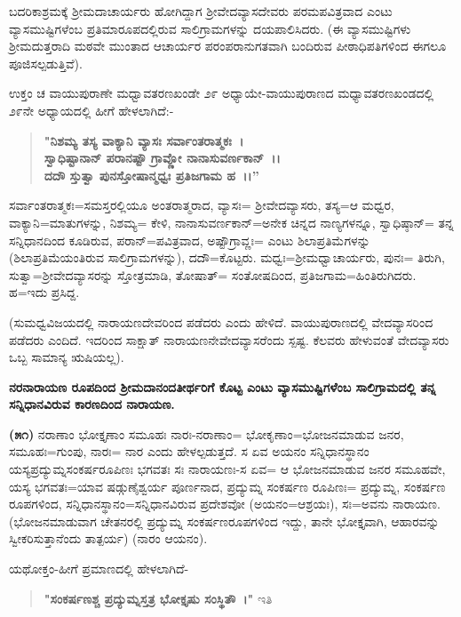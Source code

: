 ಬದರಿಕಾಶ್ರಮಕ್ಕೆ ಶ‍್ರೀಮದಾಚಾರ್ಯರು ಹೋಗಿದ್ದಾಗ ಶ‍್ರೀವೇದವ್ಯಾಸದೇವರು ಪರಮಪವಿತ್ರವಾದ ಎಂಟು ವ್ಯಾಸಮುಷ್ಟಿಗಳೆಂಬ ಪ್ರತಿಮಾರೂಪದಲ್ಲಿರುವ ಸಾಲಿಗ್ರಾಮಗಳನ್ನು ದಯಪಾಲಿಸಿದರು. (ಈ ವ್ಯಾಸಮುಷ್ಟಿಗಳು ಶ‍್ರೀಮದುತ್ತರಾದಿ ಮಠವೇ ಮುಂತಾದ ಆಚಾರ್ಯರ ಪರಂಪರಾನುಗತವಾಗಿ ಬಂದಿರುವ ಪೀಠಾಧಿಪತಿಗಳಿಂದ ಈಗಲೂ ಪೂಜಿಸಲ್ಪಡುತ್ತಿವೆ).

ಉಕ್ತಂ ಚ ವಾಯುಪುರಾಣೇ ಮಧ್ವಾವತರಣಖಂಡೇ ೨೯ ಅಧ್ಯಾಯೇ-ವಾಯು\-ಪುರಾಣದ ಮಧ್ಯಾವತರಣಖಂಡದಲ್ಲಿ ೨೯ನೇ ಅಧ್ಯಾಯದಲ್ಲಿ ಹೀಗೆ ಹೇಳಲಾಗಿದೆ:-

\begin{verse}
\textbf{"ನಿಶಮ್ಯ ತಸ್ಯ ವಾಕ್ಯಾನಿ ವ್ಯಾಸಃ ಸರ್ವಾಂತರಾತ್ಮಕಃ~।}\\\textbf{ಸ್ವಾಧಿಷ್ಟಾನಾನ್ ಪರಾನಷ್ಟೌ ಗ್ರಾವ್ಣೋ ನಾನಾಸುವರ್ಣಕಾನ್~।।}\\\textbf{ದದೌ ಸ್ತುತ್ವಾ ಪುನಸ್ತೋಷಾನ್ಮಧ್ವಃ ಪ್ರತಿಜಗಾಮ ಹ~।।”}
\end{verse}

ಸರ್ವಾಂತರಾತ್ಮಕಃ=ಸಮಸ್ತರಲ್ಲಿಯೂ ಅಂತರಾತ್ಮರಾದ, ವ್ಯಾಸಃ= ಶ‍್ರೀವೇದವ್ಯಾಸರು, ತಸ್ಯ=ಆ ಮಧ್ವರ, ವಾಕ್ಯಾನಿ=ಮಾತುಗಳನ್ನು, ನಿಶಮ್ಯ= ಕೇಳಿ, ನಾನಾಸುವರ್ಣಕಾನ್=ಅನೇಕ ಚಿನ್ನದ ನಾಣ್ಯಗಳನ್ನೂ, ಸ್ವಾಧಿಷ್ಠಾನ್= ತನ್ನ ಸನ್ನಿಧಾನದಿಂದ ಕೂಡಿರುವ, ಪರಾನ್=ಪವಿತ್ರ\-ವಾದ, ಅಷ್ಟೌಗ್ರಾವ್ಣಃ= ಎಂಟು ಶಿಲಾಪ್ರತಿಮೆಗಳನ್ನು (ಶಿಲಾಪ್ರತಿಮೆಯಂತಿರುವ ಸಾಲಿಗ್ರಾಮಗಳನ್ನು), ದದೌ=ಕೊಟ್ಟರು. ಮಧ್ವಃ=ಶ‍್ರೀಮಧ್ವಾಚಾರ್ಯರು, ಪುನಃ= ತಿರುಗಿ, ಸುತ್ವಾ\break =ಶ‍್ರೀವೇದವ್ಯಾಸರನ್ನು ಸ್ತೋತ್ರಮಾಡಿ, ತೋಷಾತ್= ಸಂತೋಷದಿಂದ, ಪ್ರತಿಜಗಾಮ=\break ಹಿಂತಿರುಗಿದರು. ಹ=ಇದು ಪ್ರಸಿದ್ದ.

(ಸುಮಧ್ವವಿಜಯದಲ್ಲಿ ನಾರಾಯಣದೇವರಿಂದ ಪಡೆದರು ಎಂದು ಹೇಳಿದೆ. ವಾಯುಪುರಾಣದಲ್ಲಿ ವೇದವ್ಯಾಸರಿಂದ ಪಡೆದರು ಎಂದಿದೆ. ಇದರಿಂದ ಸಾಕ್ಷಾತ್ ನಾರಾಯಣನೇ\break ವೇದವ್ಯಾಸರೆಂದು ಸ್ಪಷ್ಟ. ಕೆಲವರು ಹೇಳುವಂತೆ ವೇದವ್ಯಾಸರು ಒಬ್ಬ ಸಾಮಾನ್ಯ ಋಷಿಯಲ್ಲ).

\begin{center}
\textbf{ನರನಾರಾಯಣ ರೂಪದಿಂದ ಶ‍್ರೀಮದಾನಂದತೀರ್ಥರಿಗೆ ಕೊಟ್ಟ ಎಂಟು ವ್ಯಾಸಮುಷ್ಟಿಗಳೆಂಬ ಸಾಲಿಗ್ರಾಮದಲ್ಲಿ ತನ್ನ ಸನ್ನಿಧಾನವಿರುವ ಕಾರಣದಿಂದ ನಾರಾಯಣ.}
\end{center}

\textbf{(೫೧)} ನರಾಣಾಂ ಭೋಕ್ತೃಣಾಂ ಸಮೂಹಃ ನಾರಃ-ನರಾಣಾಂ= ಭೋಕೃಣಾಂ=ಭೋಜನ\-ಮಾಡುವ ಜನರ, ಸಮೂಹಃ=ಗುಂಪು, ನಾರಃ= ನಾರ ಎಂದು ಹೇಳಲ್ಪಡುತ್ತದೆ. ಸ ಏವ ಅಯನಂ ಸನ್ನಿಧಾನಸ್ಥಾನಂ ಯಸ್ಯಪ್ರದ್ಯುಮ್ನಸಂಕರ್ಷರೂಪಿಣಃ ಭಗವತಃ ಸಃ ನಾರಾ\-ಯಣಃ-ಸ ಏವ= ಆ ಭೋಜನಮಾಡುವ ಜನರ ಸಮೂಹವೇ, ಯಸ್ಯ ಭಗವತಃ=ಯಾವ ಷಡ್ಗುಣೈಶ್ವರ್ಯ ಪೂರ್ಣನಾದ, ಪ್ರದ್ಯುಮ್ನ ಸಂಕರ್ಷಣ ರೂಪಿಣಃ= ಪ್ರದ್ಯುಮ್ನ, ಸಂಕರ್ಷಣ ರೂಪಗಳಿಂದ, ಸನ್ನಿಧಾನಸ್ಥಾನಂ=ಸನ್ನಿಧಾನವಿರುವ ಪ್ರದೇಶವೋ (ಅಯನಂ=ಆಶ್ರಯಃ), ಸಃ=ಅವನು ನಾರಾಯಣ. (ಭೋಜನಮಾಡುವಾಗ ಚೇತನರಲ್ಲಿ ಪ್ರದ್ಯುಮ್ನ ಸಂಕರ್ಷಣರೂಪಗಳಿಂದ ಇದ್ದು, ತಾನೇ ಭೋಕ್ತೃವಾಗಿ, ಆಹಾರವನ್ನು ಸ್ವೀಕರಿಸುತ್ತಾನೆಂದು ತಾತ್ಪರ್ಯ) (ನಾರಂ ಆಯನಂ).

ಯಥೋಕ್ತಂ-ಹೀಗೆ ಪ್ರಮಾಣದಲ್ಲಿ ಹೇಳಲಾಗಿದೆ-

\begin{verse}
\textbf{"ಸಂಕರ್ಷಣಶ್ಚ ಪ್ರದ್ಯುಮ್ನಸ್ತತ್ರ ಭೋಕ್ತೃಷು ಸಂಸ್ಥಿತೌ~।"} ಇತಿ
\end{verse}

